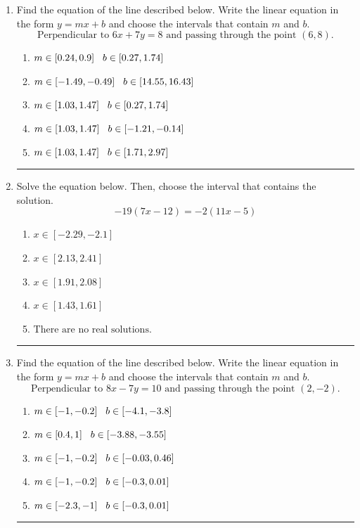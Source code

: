 \documentclass[14pt]{extbook}
\newcommand{\litem}[1]{\item#1\hspace*{-1cm}\rule{\textwidth}{0.4pt}}
\begin{document}
\begin{enumerate}
{\begin{enumerate}[label=\Alph*.]
\end{enumerate} }
\litem{
Find the equation of the line described below. Write the linear equation in the form $ y=mx+b $ and choose the intervals that contain $m$ and $b$.\[ \text{Perpendicular to } 6 x + 7 y = 8 \text{ and passing through the point } (6, 8). \]\begin{enumerate}[label=\Alph*.]
\item \( m \in [0.24, 0.9] \hspace*{3mm} b \in [0.27, 1.74] \)
\item \( m \in [-1.49, -0.49] \hspace*{3mm} b \in [14.55, 16.43] \)
\item \( m \in [1.03, 1.47] \hspace*{3mm} b \in [0.27, 1.74] \)
\item \( m \in [1.03, 1.47] \hspace*{3mm} b \in [-1.21, -0.14] \)
\item \( m \in [1.03, 1.47] \hspace*{3mm} b \in [1.71, 2.97] \)

\end{enumerate} }
\litem{
Solve the equation below. Then, choose the interval that contains the solution.\[ -19(7x -12) = -2(11x -5) \]\begin{enumerate}[label=\Alph*.]
\item \( x \in [-2.29, -2.1] \)
\item \( x \in [2.13, 2.41] \)
\item \( x \in [1.91, 2.08] \)
\item \( x \in [1.43, 1.61] \)
\item \( \text{There are no real solutions.} \)

\end{enumerate} }
\litem{
Find the equation of the line described below. Write the linear equation in the form $ y=mx+b $ and choose the intervals that contain $m$ and $b$.\[ \text{Perpendicular to } 8 x - 7 y = 10 \text{ and passing through the point } (2, -2). \]\begin{enumerate}[label=\Alph*.]
\item \( m \in [-1, -0.2] \hspace*{3mm} b \in [-4.1, -3.8] \)
\item \( m \in [0.4, 1] \hspace*{3mm} b \in [-3.88, -3.55] \)
\item \( m \in [-1, -0.2] \hspace*{3mm} b \in [-0.03, 0.46] \)
\item \( m \in [-1, -0.2] \hspace*{3mm} b \in [-0.3, 0.01] \)
\item \( m \in [-2.3, -1] \hspace*{3mm} b \in [-0.3, 0.01] \)


\end{enumerate}}
\end{enumerate}
\end{document}
